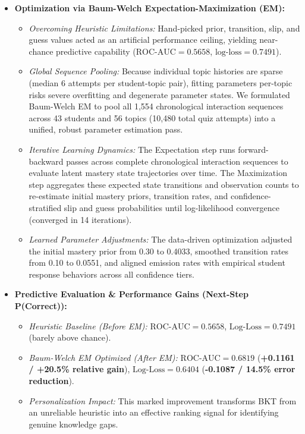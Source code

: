 {\begin{itemize}
\begin{itemize}
        \item \textbf{Optimization via Baum-Welch Expectation-Maximization (EM):}
        \begin{itemize}[itemsep=1pt,topsep=1pt]
            \item \textit{Overcoming Heuristic Limitations:} Hand-picked prior, transition, slip, and guess values acted as an artificial performance ceiling, yielding near-chance predictive capability ($\text{ROC-AUC} = 0.5658$, $\text{log-loss} = 0.7491$).
            \item \textit{Global Sequence Pooling:} Because individual topic histories are sparse (median 6 attempts per student-topic pair), fitting parameters per-topic risks severe overfitting and degenerate parameter states. We formulated Baum-Welch EM to pool all 1,554 chronological interaction sequences across 43 students and 56 topics (10,480 total quiz attempts) into a unified, robust parameter estimation pass.
            \item \textit{Iterative Learning Dynamics:} The Expectation step runs forward-backward passes across complete chronological interaction sequences to evaluate latent mastery state trajectories over time. The Maximization step aggregates these expected state transitions and observation counts to re-estimate initial mastery priors, transition rates, and confidence-stratified slip and guess probabilities until log-likelihood convergence (converged in 14 iterations).
            \item \textit{Learned Parameter Adjustments:} The data-driven optimization adjusted the initial mastery prior from 0.30 to 0.4033, smoothed transition rates from 0.10 to 0.0551, and aligned emission rates with empirical student response behaviors across all confidence tiers.
        \end{itemize}
        \item \textbf{Predictive Evaluation \& Performance Gains (Next-Step P(Correct)):}
        \begin{itemize}[itemsep=1pt,topsep=1pt]
            \item \textit{Heuristic Baseline (Before EM):} $\text{ROC-AUC} = \mathbf{0.5658}$, $\text{Log-Loss} = \mathbf{0.7491}$ (barely above chance).
            \item \textit{Baum-Welch EM Optimized (After EM):} $\text{ROC-AUC} = \mathbf{0.6819}$ (\textbf{+0.1161 / +20.5\% relative gain}), $\text{Log-Loss} = \mathbf{0.6404}$ (\textbf{-0.1087 / 14.5\% error reduction}).
            \item \textit{Personalization Impact:} This marked improvement transforms BKT from an unreliable heuristic into an effective ranking signal for identifying genuine knowledge gaps.

\end{itemize}
\end{itemize}
\end{itemize}}
